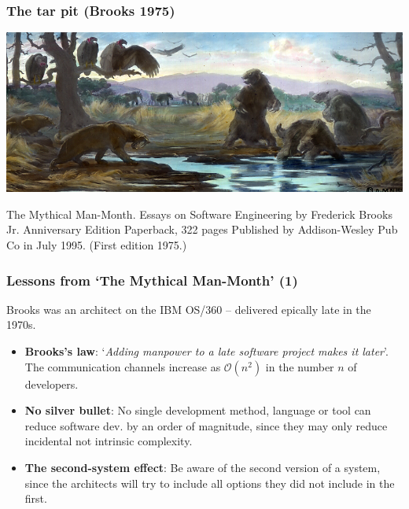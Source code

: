\documentclass{beamer} %
\newcommand\emc[1]{\textcolor{midred}{\textbf{#1}}}
\begin{document}
\begin{frame}
\frametitle{The tar pit (Brooks 1975)}

\begin{center}
\includegraphics[scale=0.4]{assets/La_Brea_Tar_Pits.jpg}
\end{center}

{\small The Mythical Man-Month. Essays on Software Engineering by Frederick Brooks Jr. Anniversary Edition  Paperback, 322 pages Published by Addison-Wesley Pub Co in July 1995. (First edition 1975.)}

\end{frame}

\begin{frame}
\frametitle{Lessons from `The Mythical Man-Month' (1)}

Brooks was an architect on the IBM OS/360 -- delivered epically late in the 1970s.
\begin{itemize}
  \item  \emc{Brooks's law}: `\emph{Adding manpower to a late software project makes it later}'. The communication channels increase as $\mathcal{O}(n^2)$ in the number $n$ of developers.
  \item \emc{No silver bullet}: No single development method, language or tool can reduce software dev. by an order of magnitude, since they may only reduce incidental not intrinsic complexity.
  \item \emc{The second-system effect}: Be aware of the second version of a system, since the architects will try to include all options they did not include in the first.
\end{itemize}

\end{frame}
\end{document}
